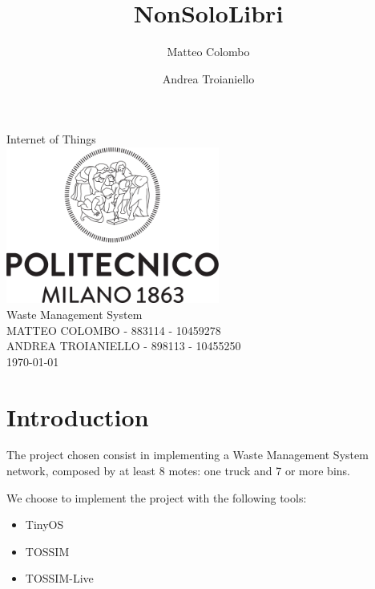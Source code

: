 \documentclass[a4paper,12pt,notitlepage]{report}
\author{Matteo Colombo \and Andrea Troianiello}
\title{NonSoloLibri}
\begin{document}
\begin{titlepage}           %
    \centering
    {\Large Internet of Things}\\[4em]
    \includegraphics[width=7cm]{polimi.png}\\[8em]
    {\Huge Waste Management System}\\[4em]
    {\large MATTEO COLOMBO - 883114 - 10459278}\\[1em]
    {\large ANDREA TROIANIELLO - 898113 - 10455250}\\[4em]
    \today
\end{titlepage}


\section*{Introduction}
The project chosen consist in implementing a Waste Management System network,
composed by at least 8 motes: one truck and 7 or more bins.

We choose to implement the project with the following tools:
\begin{itemize}
    \item TinyOS
    \item TOSSIM
    \item TOSSIM-Live
\end{itemize}
\end{document}
